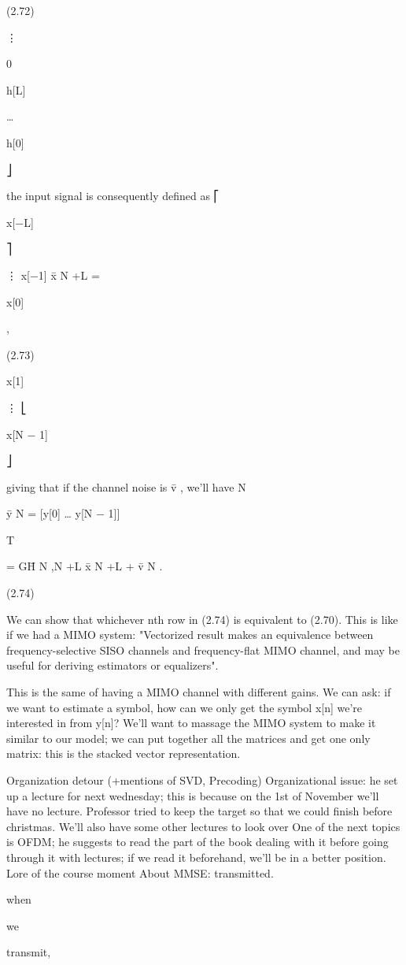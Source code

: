 {(2.72)

⋮

0

h[L]

…

h[0]

⎦

the input signal is consequently defined as
⎡

x[−L]

⎤

⋮
x[−1]
x̄ N +L =

x[0]

,

(2.73)

x[1]

⋮
⎣

x[N − 1]

⎦

giving that if the channel noise is v̄ , we'll have N

ȳ N = [y[0] … y[N − 1]]

T

= \sqrt GH̄ N ,N +L x̄ N +L + v̄ N .

(2.74)

We can show that whichever nth row in (2.74) is equivalent to (2.70).
This is like if we had a MIMO system: "Vectorized result makes an equivalence between frequency-selective SISO channels and frequency-flat MIMO channel, and may be useful for deriving estimators or equalizers".

This is the same of having a MIMO channel with different gains.
We can ask: if we want to estimate a symbol, how can we only get the symbol x[n]
we're interested in from y[n]?
We'll want to massage the MIMO system to make it similar to our model; we can put together all the matrices and get one only matrix: this is the stacked vector representation.

Organization detour (+mentions of SVD, Precoding)
Organizational issue: he set up a lecture for next wednesday; this is because on the 1st of November we'll have no lecture.
Professor tried to keep the target so that we could finish before christmas.
We'll also have some other lectures to look over One of the next topics is OFDM; he suggests to read the part of the book dealing with it before going through it with lectures; if we read it beforehand, we'll be in a better position.
Lore of the course moment About MMSE:
transmitted.

when

we

transmit,

}
